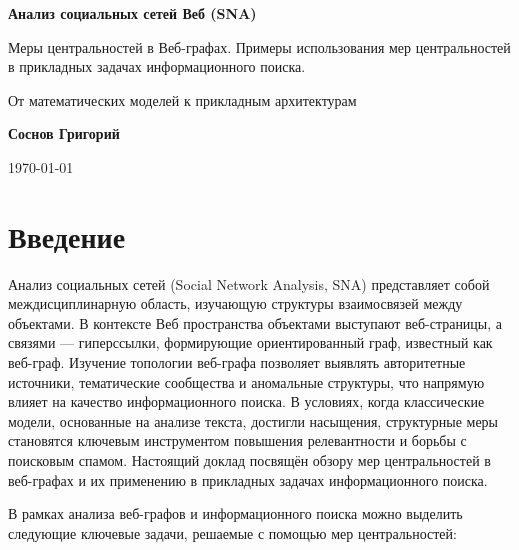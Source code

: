 \documentclass[12pt, a4paper]{article}
\begin{document}
\begin{titlepage}
    \centering
    \vspace*{5cm}
    {\Huge \textbf{Анализ социальных сетей Веб (SNA)} \par}
    \vspace{1cm}
    {\Large {Меры центральностей в Веб-графах. Примеры использования мер центральностей в прикладных задачах информационного поиска.} \par}
    \vspace{0.5cm}
    {\Large От математических моделей к прикладным архитектурам \par}
    \vspace{3cm}
    {\Large \textbf{Соснов Григорий} \par}
    \vfill
    {\large \today \par}
\end{titlepage}

\tableofcontents
\newpage

\section{Введение}

Анализ социальных сетей (Social Network Analysis, SNA) представляет собой междисциплинарную область, изучающую структуры взаимосвязей между объектами. В контексте Веб пространства объектами выступают веб-страницы, а связями — гиперссылки, формирующие ориентированный граф, известный как веб-граф. Изучение топологии веб-графа позволяет выявлять авторитетные источники, тематические сообщества и аномальные структуры, что напрямую влияет на качество информационного поиска. В условиях, когда классические модели, основанные на анализе текста, достигли насыщения, структурные меры становятся ключевым инструментом повышения релевантности и борьбы с поисковым спамом. Настоящий доклад посвящён обзору мер центральностей в веб-графах и их применению в прикладных задачах информационного поиска.


В рамках анализа веб-графов и информационного поиска можно выделить следующие ключевые задачи, решаемые с помощью мер центральностей:
\end{document}
